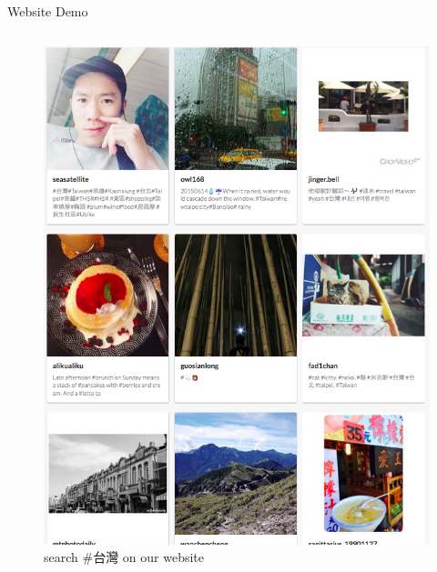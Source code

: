 \documentclass[final,hyperref={pdfpagelabels=false}]{beamer}
\begin{document}
\begin{frame}[t]
\begin{columns}[t]
\begin{column}{.465\textwidth}
\begin{block}{Website Demo}
\begin{columns}
\begin{column}{.5\textwidth}
\begin{figure}
\includegraphics[width=0.8\linewidth]{after}
\caption{search \#台灣 on our website}
\end{figure}

\end{column}

\end{columns}

\end{block}







\end{column}
\end{columns}
\end{frame}
\end{document}
